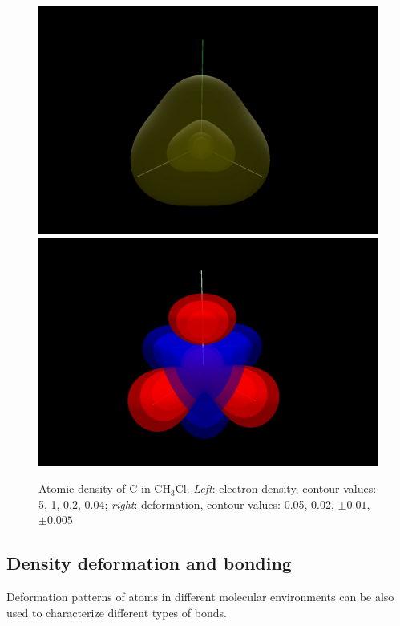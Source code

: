 \documentclass[10pt]{article}
\begin{document}
\begin{figure}[H]
\begin{center}
\includegraphics[width=.3\linewidth]{CH3Cl-pVTZ-d-C.png}
\hspace*{5mm}
\includegraphics[width=.3\linewidth]{CH3Cl-pVTZ-def-C.png}
\end{center}
\caption[Atomic density of C in CH$_3$Cl]{ Atomic density of C in CH$_3$Cl. {\it Left}: electron density,
contour values: 5, 1, 0.2, 0.04; {\it right}: deformation, contour values:
0.05, 0.02, $\pm 0.01$, $\pm 0.005$
\label{fig:6_2_2}}
\end{figure}

\subsection{Density deformation and bonding \label{sec:6.3}}

Deformation patterns of atoms in different molecular
environments can be also used to characterize different types of bonds.
\end{document}
